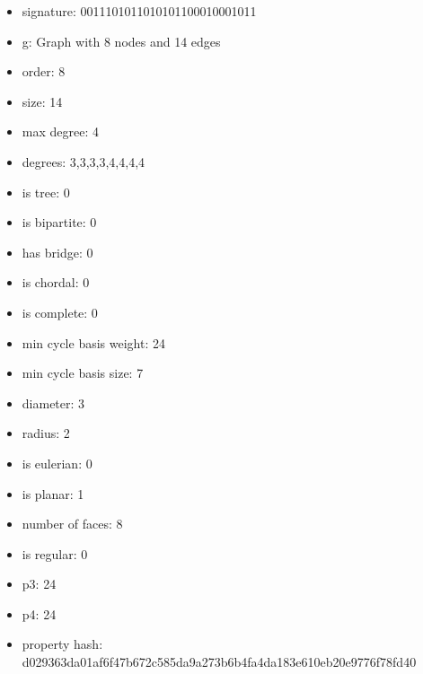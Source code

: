 \begin{itemize}
\item signature: 0011101011010101100010001011
\item g: Graph with 8 nodes and 14 edges
\item order: 8
\item size: 14
\item max degree: 4
\item degrees: 3,3,3,3,4,4,4,4
\item is tree: 0
\item is bipartite: 0
\item has bridge: 0
\item is chordal: 0
\item is complete: 0
\item min cycle basis weight: 24
\item min cycle basis size: 7
\item diameter: 3
\item radius: 2
\item is eulerian: 0
\item is planar: 1
\item number of faces: 8
\item is regular: 0
\item p3: 24
\item p4: 24
\item property hash: d029363da01af6f47b672c585da9a273b6b4fa4da183e610eb20e9776f78fd40
\end{itemize}
\newpage
\begin{figure}
\end{figure}

